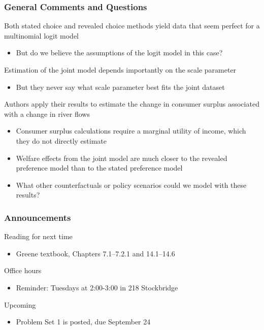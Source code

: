 \documentclass{beamer}\usepackage[]{graphicx}\usepackage[]{color}
\begin{document}
\begin{frame}\frametitle{General Comments and Questions}
    Both stated choice and revealed choice methods yield data that seem perfect for a multinomial logit model
    \begin{itemize}
    	\item But do we believe the assumptions of the logit model in this case?
    \end{itemize}
    \vspace{2ex}
    Estimation of the joint model depends importantly on the scale parameter
    \begin{itemize}
    	\item But they never say what scale parameter best fits the joint dataset
    \end{itemize}
    \vspace{2ex}
    Authors apply their results to estimate the change in consumer surplus associated with a change in river flows
    \begin{itemize}
    	\item Consumer surplus calculations require a marginal utility of income, which they do not directly estimate
    	\item Welfare effects from the joint model are much closer to the revealed preference model than to the stated preference model
    	\item What other counterfactuals or policy scenarios could we model with these results?
    \end{itemize}
\end{frame}

\begin{frame}\frametitle{Announcements}
    Reading for next time
    \begin{itemize}
        \item Greene textbook, Chapters 7.1--7.2.1 and 14.1--14.6
    \end{itemize}
    \vspace{3ex}
    Office hours
    \begin{itemize}
    	\item Reminder: Tuesdays at 2:00-3:00 in 218 Stockbridge
    \end{itemize}
    \vspace{3ex}
    Upcoming
    \begin{itemize}
        \item Problem Set 1 is posted, due September 24
    \end{itemize}
\end{frame}
\end{document}
